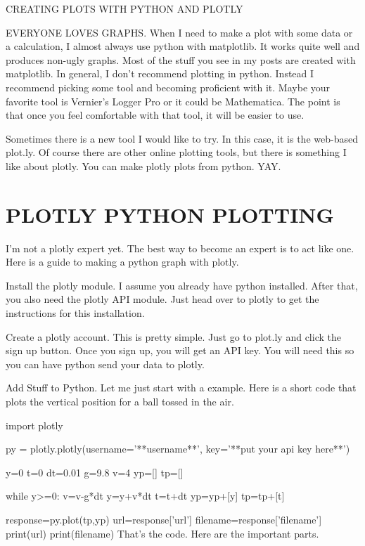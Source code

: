 CREATING PLOTS WITH PYTHON AND PLOTLY


EVERYONE LOVES GRAPHS. When I need to make a plot with some data or a calculation, I almost always use python with matplotlib. It works quite well and produces non-ugly graphs. Most of the stuff you see in my posts are created with matplotlib. In general, I don’t recommend plotting in python. Instead I recommend picking some tool and becoming proficient with it. Maybe your favorite tool is Vernier’s Logger Pro or it could be Mathematica. The point is that once you feel comfortable with that tool, it will be easier to use.

Sometimes there is a new tool I would like to try. In this case, it is the web-based plot.ly. Of course there are other online plotting tools, but there is something I like about plotly. You can make plotly plots from python. YAY.

\section{PLOTLY PYTHON PLOTTING}

I’m not a plotly expert yet. The best way to become an expert is to act like one. Here is a guide to making a python graph with plotly.

Install the plotly module. I assume you already have python installed. After that, you also need the plotly API module. Just head over to plotly to get the instructions for this installation.

Create a plotly account. This is pretty simple. Just go to plot.ly and click the sign up button. Once you sign up, you will get an API key. You will need this so you can have python send your data to plotly.

Add Stuff to Python. Let me just start with a example. Here is a short code that plots the vertical position for a ball tossed in the air.

import plotly

py = plotly.plotly(username='**username**', key='**put your api key here**')


y=0
t=0
dt=0.01
g=9.8
v=4
yp=[]
tp=[]

while y>=0:
    v=v-g*dt
    y=y+v*dt
    t=t+dt
    yp=yp+[y]
    tp=tp+[t]



response=py.plot(tp,yp)
url=response['url']
filename=response['filename']
print(url)
print(filename)
That’s the code. Here are the important parts.

